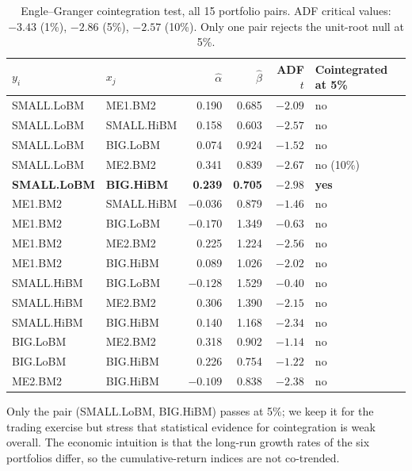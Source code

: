 \documentclass[11pt,a4paper]{article}
\begin{document}
\begin{table}[h!]
\centering
\caption{Engle--Granger cointegration test, all 15 portfolio pairs. ADF critical values: $-3.43$ (1\%), $-2.86$ (5\%), $-2.57$ (10\%). Only one pair rejects the unit-root null at 5\%.}
\label{tab:coint}
\scriptsize
\begin{tabular}{ll rrrl}
\toprule
$y_i$ & $x_j$ & $\hat\alpha$ & $\hat\beta$ & ADF $t$ & Cointegrated at 5\% \\
\midrule
SMALL.LoBM & ME1.BM2     & 0.190 & 0.685 & $-2.09$ & no \\
SMALL.LoBM & SMALL.HiBM  & 0.158 & 0.603 & $-2.57$ & no \\
SMALL.LoBM & BIG.LoBM    & 0.074 & 0.924 & $-1.52$ & no \\
SMALL.LoBM & ME2.BM2     & 0.341 & 0.839 & $-2.67$ & no (10\%) \\
\textbf{SMALL.LoBM} & \textbf{BIG.HiBM} & \textbf{0.239} & \textbf{0.705} & \textbf{$-2.98$} & \textbf{yes} \\
ME1.BM2    & SMALL.HiBM  & $-0.036$ & 0.879 & $-1.46$ & no \\
ME1.BM2    & BIG.LoBM    & $-0.170$ & 1.349 & $-0.63$ & no \\
ME1.BM2    & ME2.BM2     & 0.225 & 1.224 & $-2.56$ & no \\
ME1.BM2    & BIG.HiBM    & 0.089 & 1.026 & $-2.02$ & no \\
SMALL.HiBM & BIG.LoBM    & $-0.128$ & 1.529 & $-0.40$ & no \\
SMALL.HiBM & ME2.BM2     & 0.306 & 1.390 & $-2.15$ & no \\
SMALL.HiBM & BIG.HiBM    & 0.140 & 1.168 & $-2.34$ & no \\
BIG.LoBM   & ME2.BM2     & 0.318 & 0.902 & $-1.14$ & no \\
BIG.LoBM   & BIG.HiBM    & 0.226 & 0.754 & $-1.22$ & no \\
ME2.BM2    & BIG.HiBM    & $-0.109$ & 0.838 & $-2.38$ & no \\
\bottomrule
\end{tabular}
\end{table}

Only the pair (SMALL.LoBM, BIG.HiBM) passes at 5\%; we keep it for the trading exercise but stress that statistical evidence for cointegration is weak overall. The economic intuition is that the long-run growth rates of the six portfolios differ, so the cumulative-return indices are not co-trended.
\end{document}
